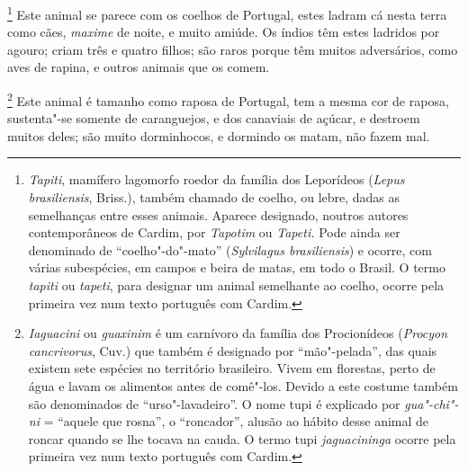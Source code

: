 \footnote{ \textit{Tapiti}, mamífero lagomorfo
roedor da família dos Leporídeos (\textit{Lepus brasiliensis}, Briss.), 
também chamado de coelho, ou lebre, dadas as semelhanças
entre esses animais. Aparece designado, noutros autores contemporâneos
de Cardim, por \textit{Tapotim} ou \textit{Tapeti.} Pode ainda ser
denominado de ``coelho"-do"-mato'' (\textit{Sylvilagus brasiliensis}) e
ocorre, com várias subespécies, em campos e beira de matas, em todo o
Brasil. O termo \textit{tapiti} ou \textit{tapeti}, para designar um
animal semelhante ao coelho, ocorre pela primeira vez num
texto português com Cardim.} Este animal se parece com os
coelhos de Portugal, estes ladram cá nesta terra como cães,
\textit{maxime} de noite, e muito amiúde. Os índios têm estes ladridos
por agouro; criam três e quatro filhos; são raros porque têm muitos
adversários, como aves de rapina, e outros animais que os comem.

\footnote{ \textit{Iaguacini} ou
\textit{guaxinim} é um carnívoro da família dos Procionídeos 
(\textit{Procyon cancrivorus}, Cuv.) que também é designado por
``mão"-pelada'', das quais existem sete espécies no território
brasileiro. Vivem em florestas, perto de água e lavam os alimentos
antes de comê"-los. Devido a este costume também são denominados de ``urso"-lavadeiro''. 
O nome tupi é explicado por \textit{gua"-chi"-ni} = ``aquele que rosna'', 
o ``roncador'', alusão ao hábito desse animal de
roncar quando se lhe tocava na cauda. O termo tupi \textit{jaguacininga}
ocorre pela primeira vez num texto português com Cardim.} Este animal 
é tamanho como raposa de Portugal, tem a mesma cor de
raposa, sustenta"-se somente de caranguejos, e dos canaviais de açúcar,
e destroem muitos deles; são muito dorminhocos, e dormindo os matam,
não fazem mal. 

